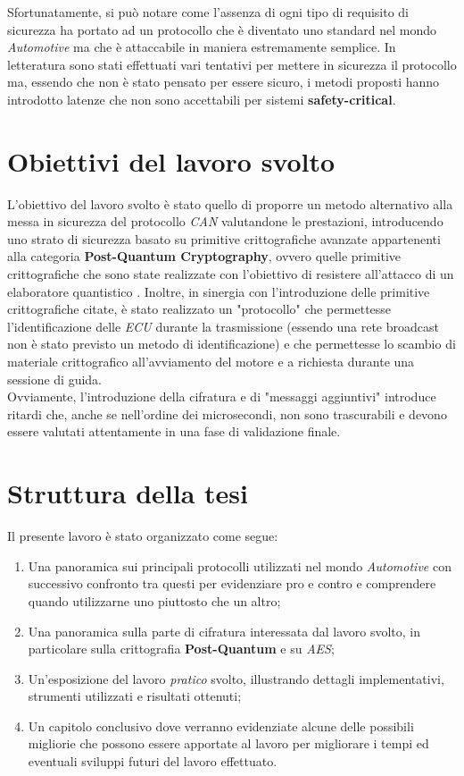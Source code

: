 Sfortunatamente, si può notare come l'assenza di ogni tipo di requisito di sicurezza ha portato ad un protocollo che è diventato uno standard nel mondo \emph{Automotive} ma che è attaccabile in maniera estremamente semplice. In letteratura sono stati effettuati vari tentativi per mettere in sicurezza il protocollo ma, essendo che non è stato pensato per essere sicuro, i metodi proposti hanno introdotto latenze che non sono accettabili per sistemi \textbf{safety-critical}. \cite{bozdal_samie_jennions_2018}

\section{Obiettivi del lavoro svolto} %
L'obiettivo del lavoro svolto è stato quello di proporre un metodo alternativo alla messa in sicurezza del protocollo \emph{CAN} valutandone le prestazioni, introducendo uno strato di sicurezza basato su primitive crittografiche avanzate appartenenti alla categoria \textbf{Post-Quantum Cryptography}, ovvero quelle primitive crittografiche che sono state realizzate con l'obiettivo di resistere all'attacco di un elaboratore quantistico \cite{wikipedia_pqc}. Inoltre, in sinergia con l'introduzione delle primitive crittografiche citate, è stato realizzato un "protocollo" che permettesse l'identificazione delle \emph{ECU} durante la trasmissione (essendo una rete broadcast non è stato previsto un metodo di identificazione) e che permettesse lo scambio di materiale crittografico all'avviamento del motore e a richiesta durante una sessione di guida. \\
Ovviamente, l'introduzione della cifratura e di "messaggi aggiuntivi" introduce ritardi che, anche se nell'ordine dei microsecondi, non sono trascurabili e devono essere valutati attentamente in una fase di validazione finale.

\section{Struttura della tesi}
Il presente lavoro è stato organizzato come segue:
\begin{enumerate}
    \item Una panoramica sui principali protocolli utilizzati nel mondo \emph{Automotive} con successivo confronto tra questi per evidenziare pro e contro e comprendere quando utilizzarne uno piuttosto che un altro;
    \item Una panoramica sulla parte di cifratura interessata dal lavoro svolto, in particolare sulla crittografia \textbf{Post-Quantum} e su \emph{AES};
    \item Un'esposizione del lavoro \emph{pratico} svolto, illustrando dettagli implementativi, strumenti utilizzati e risultati ottenuti;
    \item Un capitolo conclusivo dove verranno evidenziate alcune delle possibili migliorie che possono essere apportate al lavoro per migliorare i tempi ed eventuali sviluppi futuri del lavoro effettuato.
\end{enumerate}